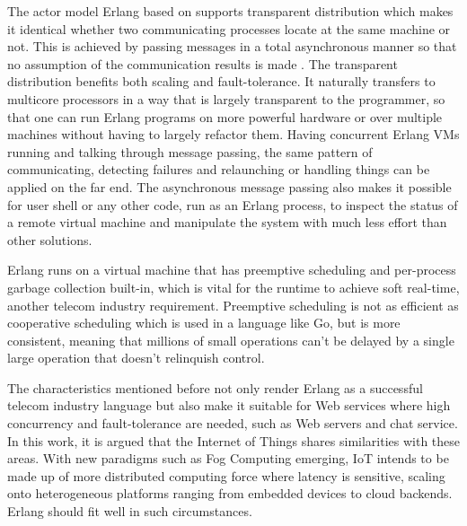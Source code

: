 The actor model Erlang based on supports transparent distribution which makes it identical whether two communicating processes locate at the same machine or not. This is achieved by passing messages in a total asynchronous manner so that no assumption of the communication results is made \autocite{learn_you_some_erlang}. The transparent distribution benefits both scaling and fault-tolerance. It naturally transfers to multicore processors in a way that is largely transparent to the programmer, so that one can run Erlang programs on more powerful hardware or over multiple machines without having to largely refactor them. Having concurrent Erlang VMs running and talking through message passing, the same pattern of communicating, detecting failures and relaunching or handling things can be applied on the far end. The asynchronous message passing also makes it possible for user shell or any other code, run as an Erlang process, to inspect the status of a remote virtual machine and manipulate the system with much less effort than other solutions.  

Erlang runs on a virtual machine that has preemptive scheduling and per-process garbage collection built-in, which is vital for the runtime to achieve soft real-time, another telecom industry requirement. Preemptive scheduling is not as efficient as cooperative scheduling which is used in a language like Go, but is more consistent, meaning that millions of small operations can't be delayed by a single large operation that doesn't relinquish control. 

The characteristics mentioned before not only render Erlang as a successful telecom industry language but also make it suitable for Web services where high concurrency and fault-tolerance are needed, such as Web servers and chat service. In this work, it is argued that the Internet of Things shares similarities with these areas. With new paradigms such as Fog Computing emerging, IoT intends to be made up of more distributed computing force where latency is sensitive, scaling onto heterogeneous platforms ranging from embedded devices to cloud backends. Erlang should fit well in such circumstances. 

